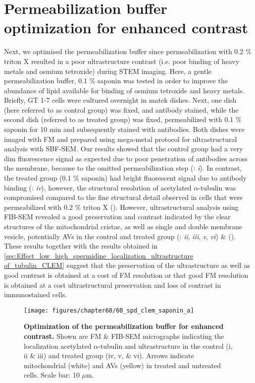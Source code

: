 \section{Permeabilization buffer optimization for enhanced contrast}
Next, we optimised the permeabilization buffer since permeabilization with 0.2 \% triton X resulted in a poor ultrastructure contrast (i.e. poor binding of heavy metals and osmium tetroxide) during STEM imaging. Here, a gentle permeabilization buffer, 0.1 \% saponin was tested in order to improve the abundance of lipid available for binding of osmium tetroxide and heavy metals. Briefly, GT 1-7 cells were cultured overnight in matek dishes. Next, one dish (here referred to as control group) was fixed, and antibody stained, while the second dish (referred to as treated group) was fixed, permeabilized with 0.1 \% saponin for 10 min and subsequently stained with antibodies. Both dishes were imaged with FM and prepared using mega-metal protocol for ultrastructural analysis with SBF-SEM. Our results showed that the control group had a very dim fluorescence signal as expected due to poor penetration of antibodies across the membrane, because to the omitted permeabilization step (: \textit{i}). In contrast, the treated group (0.1 \% saponin) had bright fluorescent signal due to antibody binding (: \textit{iv}), however, the structural resolution of acetylated $\alpha$-tubulin was compromised compared to the fine structural detail observed in cells that were permeabilized with 0.2 \% triton X (). However, ultrastructural analysis using FIB-SEM revealed a good preservation and contrast indicated by the clear structures of the mitochondrial cristae, as well as single and double membrane vesicle, potentially AVs in the control and treated group (: \textit{ii}, \textit{iii}, \textit{v}, \textit{vi}) \& (). These results together with the results obtained in \cref{sec:Effect_low_high_spermidine_localization_ultrastructure of_tubulin_CLEM} suggest that the preservation of the ultrastructure as well as good contrast is obtained at a cost of FM resolution or that good FM resolution is obtained at a cost ultrastructural preservation and loss of contrast in immunostained cells.

\begin{landscape}
\begin{figure}[!htbp]
\center
 \texttt{[image: figures/chapter60/60\_spd\_clem\_saponin\_a]}
 \caption[Optimization of the permeabilization buffer for enhanced contrast]{\textbf{Optimization of the permeabilization buffer for enhanced contrast.} Shown are FM \& FIB-SEM micrographs indicating the localization acetylated $\alpha$-tubulin and ultrastructure in the control (i, ii \& iii) and treated group (iv, v, \& vi). Arrows indicate mitochondrial (white) and AVs (yellow) in treated and untreated cells. Scale bar: 10 $\mu$m.}
 \label{fig:60_spd_clem_saponin_a}
\end{figure} 
\end{landscape}

